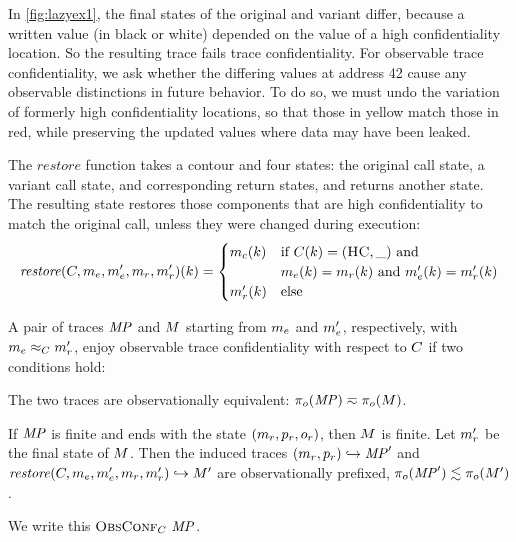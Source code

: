 \documentclass[acmsmall,review,anonymous]{acmart}\settopmatter{printfolios=true,printccs=false,printacmref=false}
\begin{document}
      In \cref{fig:lazyex1}, the final states of the original and variant
      differ, because a written value (in black or white) depended on the value
      of a high confidentiality location. So the resulting trace fails trace
      confidentiality. For observable trace confidentiality, we ask whether the
      differing values at address 42 cause any observable distinctions in
      future behavior. To do so, we must undo the variation of formerly high
      confidentiality locations, so that those in yellow match those in red,
      while preserving the updated values where data may have been leaked.

      The \(\mathit{restore}\) function takes a contour and four states: the
      original call state, a variant call state, and corresponding return
      states, and returns another state. The resulting state restores those
      components that are high confidentiality to match the original call,
      unless they were changed during execution:
      \[\mathit{restore}(C,m_e,m_e',m_r,m_r')(k) =
        \begin{cases}
          m_c(k) & \text{if } C(k) = (\textsc{HC},\_) \text{ and } \\
                  & m_e(k) = m_r(k) \text{ and }
                    m_e'(k) = m_r'(k) \\
          m_r'(k) & \text{else} \\
        \end{cases}\]

      A pair of traces \(\mathit{MP}\) and \(M\) starting from \(m_e\) and
      \(m_e'\), respectively, with \(m_e \approx_C m_r'\),
      enjoy observable trace confidentiality with respect to \(C\) if
      two conditions hold:

      The two traces are observationally equivalent: \(\pi_o(\mathit{MP}) \eqsim
      \pi_o(M)\).

      If \(\mathit{MP}\) is finite and ends with the state
      \((m_r,p_r,o_r)\), then \(M\) is finite. Let
      \(m_r'\) be the final state of \(M\). Then the induced traces
      \((m_r,p_r) \hookrightarrow \mathit{MP}'\) and
      \(\mathit{restore}(C,m_e,m_e',m_r,m_r')
      \hookrightarrow M'\) are observationally prefixed,
      \(\pi_o(\mathit{MP}') \lesssim \pi_o(M')\).

      We write this \(\text{\sc ObsConf}_C ~ \mathit{MP}\).
\end{document}
